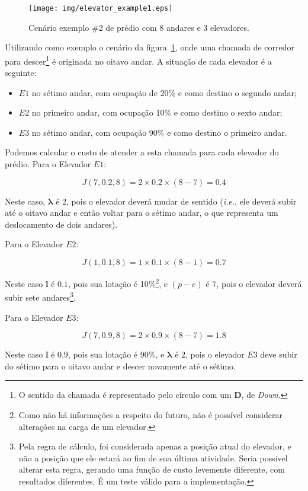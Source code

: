 \begin{figure}[htb!]
  \centering
  \texttt{[image: img/elevator\_example1.eps]}
  \caption{Cenário exemplo \#2 de prédio com 8 andares e 3 elevadores.}
  \label{fig:elevadores-1}
\end{figure}

Utilizando como exemplo o cenário da figura~\ref{fig:elevadores-1}, onde uma
chamada de corredor para descer\footnote{O sentido da chamada é representado
pelo círculo com um \textbf{D}, de \textit{Down}.} é originada no oitavo andar.
A situação de cada elevador é a seguinte:

\begin{itemize}
\item $E1$ no sétimo andar, com ocupação de 20\% e como destino o segundo andar;
\item $E2$ no primeiro andar, com ocupação 10\% e como destino o sexto andar;
\item $E3$ no sétimo andar, com ocupação 90\% e como destino o primeiro andar.
\end{itemize}

Podemos calcular o custo de atender a esta chamada para cada elevador do prédio.
Para o Elevador $E1$:

\[J(7, 0.2, 8) = 2 \times 0.2 \times (8 - 7) = 0.4\]

Neste caso, $\boldsymbol{\lambda}$ é 2, pois o elevador deverá mudar de sentido
(\textit{i.e.}, ele deverá subir até o oitavo andar e então voltar para o sétimo
andar, o que representa um deslocamento de dois andares).

Para o Elevador $E2$:

\[J(1, 0.1, 8) = 1 \times 0.1 \times (8 - 1) = 0.7\]

Neste caso $\boldsymbol{l}$ é $0.1$, pois sua lotação é 10\%\footnote{Como não
há informações a respeito do futuro, não é possível considerar alterações na
carga de um elevador.}, e $(p - e)$ é $7$, pois o elevador deverá subir sete
andares\footnote{Pela regra de cálculo, foi considerada apenas a posição atual
do elevador, e não a posição que ele estará ao fim de sua última atividade.
Seria possivel alterar esta regra, gerando uma função de custo levemente
diferente, com resultados diferentes. É um teste válido para a implementação.}.

Para o Elevador $E3$:

\[J(7, 0.9, 8) = 2 \times 0.9\times (8 - 7) = 1.8\]

Neste caso $\boldsymbol{l}$ é $0.9$, pois sua lotação é 90\%, e
$\boldsymbol{\lambda}$ é $2$, pois o elevador $E3$ deve subir do sétimo para o
oitavo andar e descer novamente até o sétimo.

